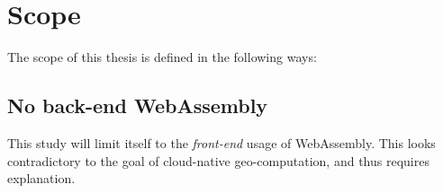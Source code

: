 













\newpage
\section{Scope}
The scope of this thesis is defined in the following ways: 


\subsection*{ No back-end WebAssembly } 
This study will limit itself to the \emph{front-end} usage of WebAssembly. This looks contradictory to the goal of cloud-native geo-computation, and thus requires explanation.

